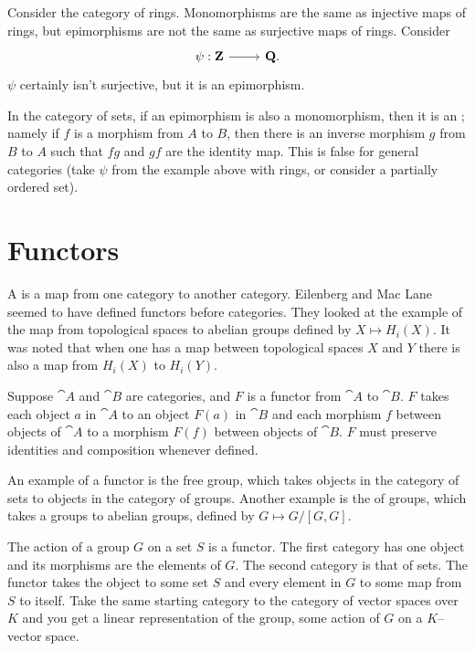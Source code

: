 \documentclass[11pt, oneside]{article}
\begin{document}
Consider the category of rings. Monomorphisms are the same as injective maps of rings, but epimorphisms are not the same as surjective maps of rings. Consider 
\[
\begin{tikzcd}
\psi:\Z \ar[r]& \Q.
\end{tikzcd}
\]
$\psi$ certainly isn't surjective, but it is an epimorphism.

In the category of sets, if an epimorphism is also a monomorphism, then it is an ; namely if $f$ is a morphism from $A$ to $B$, then there is an inverse morphism $g$ from $B$ to $A$ such that $fg$ and $gf$ are the identity map. This is false for general categories (take $\psi$ from the example above with rings, or consider a partially ordered set).


\section{Functors}
A \href{https://en.wikipedia.org/wiki/Functor}{} is a map from one category to another category. Eilenberg and Mac Lane seemed to have defined functors before categories. They looked at the example of the map from topological spaces to abelian groups defined by $X\longmapsto H_i(X)$. It was noted that when one has a map between topological spaces $X$ and $Y$ there is also a map from $H_i(X)$ to $H_i(Y)$.

Suppose $\cat A$ and $\cat B$ are categories, and $F$ is a functor from $\cat A$ to $\cat B$. $F$ takes each object $a$ in $\cat A$ to an object $F(a)$ in $\cat B$ and each morphism $f$ between objects of $\cat A$ to a morphism $F(f)$ between objects of $\cat B$. $F$ must preserve identities and composition whenever defined.

An example of a functor is the free group, which takes objects in the category of sets to objects in the category of groups. Another example is the \href{https://en.wikipedia.org/wiki/Commutator_subgroup#Abelianization}{} of groups, which takes a groups to abelian groups, defined by $G\longmapsto G/ [G,G]$.

The action of a group $G$ on a set $S$ is a functor. The first category has one object and its morphisms are the elements of $G$. The second category is that of sets. The functor takes the object to some set $S$ and every element in $G$ to some map from $S$ to itself. Take the same starting category to the category of vector spaces over $K$ and you get a linear representation of the group, some action of $G$ on a $K$--vector space. 
\end{document}
